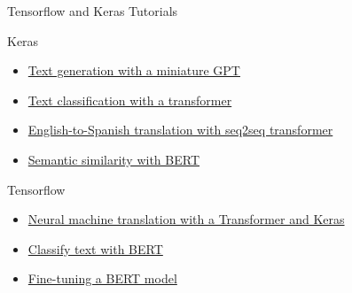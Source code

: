 \documentclass[ignorenonframetext,xcolor=x11names]{beamer}
\begin{document}
\begin{frame}{Tensorflow and Keras Tutorials}

\begin{block}{Keras}
\begin{itemize}
\item \href{https://keras.io/examples/generative/text_generation_with_miniature_gpt/}{Text generation with a miniature GPT} 
\item \href{https://keras.io/examples/nlp/text_classification_with_transformer/}{Text classification with a transformer} 
\item \href{https://keras.io/examples/nlp/neural_machine_translation_with_transformer/}{English-to-Spanish translation with seq2seq transformer} 
\item \href{https://keras.io/examples/nlp/semantic_similarity_with_bert/}{Semantic similarity with BERT} 
\end{itemize}
\end{block}

\begin{block}{Tensorflow}
\begin{itemize}
\item \href{https://www.tensorflow.org/text/tutorials/transformer}{Neural machine translation with a Transformer and Keras} 
\item \href{https://www.tensorflow.org/text/tutorials/classify_text_with_bert}{Classify text with BERT} 
\item \href{https://www.tensorflow.org/tfmodels/nlp/fine_tune_bert}{Fine-tuning a BERT model} 
\end{itemize}
\end{block}
\end{frame}
\end{document}
